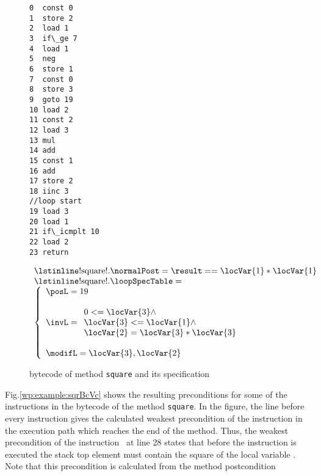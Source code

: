 \begin{figure}
\begin{minipage}[t]{32mm}
\begin{lstlisting}[frame=trbl]
0  const 0
1  store 2
2  load 1
3  if\_ge 7 
4  load 1
5  neg
6  store 1
7  const 0
8  store 3
9  goto 19 
10 load 2
11 const 2
12 load 3
13 mul
14 add
15 const 1
16 add
17 store 2
18 iinc 3
//loop start
19 load 3 
20 load 1
21 if\_icmplt 10
22 load 2
23 return
\end{lstlisting} 
\end{minipage}
\phantom{aaaaa}
\begin{minipage}[t]{20mm}
$$\begin{array}{l}
 \mbox{\rm\lstinline!square!}. \normalPost = \result == \locVar{1}* \locVar{1} \\ 
 \mbox{\rm\lstinline!square!}.\loopSpecTable =  \\
        \left\{  \begin{array}{l}  \posL   = 19 \\\\
                          \invL   =\begin{array}{l} 
                                     0 <= \locVar{3}  \wedge \\
				     \locVar{3}<= \locVar{1}   \wedge \\
                                    \locVar{2} = \locVar{3} *\locVar{3}
                                   \end{array}\\ \\
	                  \modifL =  \locVar{3}, \locVar{2}\\
			  \end{array}\right.
         \end{array}$$
\end{minipage}
\caption{\sc  bytecode of method \lstinline!square! and its specification }
\label{wp:example:sqrBc}
\end{figure}
Fig.\ref{wp:example:sqrBcVc} shows the resulting preconditions for some of the instructions in the bytecode of the method  \lstinline!square!.
In the figure, the line before every instruction gives the calculated weakest precondition of the instruction in the execution path which reaches the end 
of the method. Thus, the weakest precondition of the instruction  \return \ at line 28 states that before the instruction is executed the stack top element
\stack{\counter}  must  contain the square of the local variable . Note that this precondition is calculated from the method postcondition 
